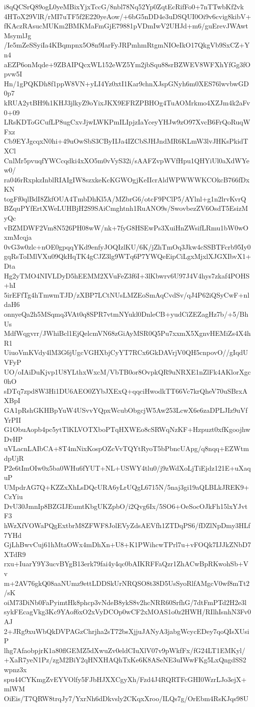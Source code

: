 i8qQCSrQ89ogL0yeMBixYjxTccG/8nbl78Nq52Yp0ZqtEcRifFo0+7nTTwbKf2vk
4HToX29VlR/rMI7uTF5f2E220yeAow/+6bG5nDD4e3uDSQUI0Oi9v6cvig8kibV+
fKAczRAsucMUKm2BMKMaFmGjE79881pVDmIwV2UHJd+m6/guErevJWAwtMsymlJg
/Ie5mZeSSyiIa4KBqmpnx5O8n9IarFyJRPmhmRtgmNIOeIkO17QkgVb9SxCZ+Yn4
aEZP6onMqde+9ZBAIPQcxWL152eWZ5Ym2jbSqu88srBZWEV8WFXhYfGg3fOpvw5I
Hn/1gPQKDh8f1ppW8VN+yLI4Yz0xtI1Kar9chnXJspGNyh6m0XES76lwvbwGD0p7
kRUA2ytBH9h1KHJ3jlkyZ9oYixJKX9EFRZPBHOg4TuAOMrkmo4XZJm4k2aFv0+09
LRsKDToGCufLP8ugCxvJjwLWKPmILIpjzIaYceyYHJw9zO97XvcB6FrQoRuqWFxz
Cb9EYJgcqxN0hi+49uOwSbS3CByIIJa4IZCbSJHJndMR6KLmW3lvJHKsPkidTXCl
CnlMr5pvuqfYWCcqdki4xXO5m0vVyS32i/sAAFZvpWVfHpu1QHYiUl0aXdWYew0/
ra046rRxpkzInblRIAIgIW8szxkeKcKGWOgjKeIIcrAldWPWWWKCOkcB766fDxKN
togFf0qlBdI8ZkfOUA4TmbDhKl5A/MZbrG6/otcF9PClP5/AYlnl+g1n2lrvKvrQ
BZquPYfErtXWeLUHBjH2S9SAiCmghtnh1RuANO9s/SwovbezZV6OsdT5EsizMyQc
vBZMDWF2Vm8N526PH08wW/nk+7fyG8HSEwPs3XuiHnZWsifLRmu1bW0wOxmMcqja
0vG3w0zlc+nOE0gpqqYKd9enfyJOQIzlKU/6K/jZhTmOq3Jkw4cSSBTFcrb95Iy0
gqRsToIMlVXu09QkHqTK4gCJZ3lg9WTq6P7YWQeEipCiLgxMjxlXJGXIbvX1+Dta
Hg2yTMO4NIVLDyD5hEEMM2XVuFeZ3f6I+3lKbwrv6U97J4V4hys7zkaf4POHS+hI
5irEFfTg4hTmwmTJD/zXBP7LCtNUsLMZEoSmAqCvdSv/qJ4P62iQSyCwF+nldaH6
onnyeQa2h5MSqmq3VAt0q8SPR7vtmNYukl0DnleCB+yudCiZEZagHz7b/+5/BhUs
MdfWqgvrr/JWhiBcl1EjQelcmVN68zGiAyMSR0Q5Pu7xxmX5XgnvHEMiZs4X4hR1
UiuoVmKVdy4lM3G6jUgcVGHXbjCyYT7RCx6GkDAVrjV0QH5cnpovO//gIqdUVFyP
UO/oIAiDuKjvp1U8YLthxWxcM/VbTB0or8OvpkQR9uNRXE1nZlFk4AKlorXgc0hO
sDTq7zpd8W3Hi1DU6AEO0ZYbJXExQ+qqciHwodkTT66Vc7krQheV70uSBrxAXBpI
GA1pRshGKHBpYuW4USvvYQpxWcubObgcjW5Aw253LcwX6e6zaDPLJIz9uVfYrPII
G1ObuAopb4pc5ytTlKLVOTXboPTqHXWEo8cSRWqNzKF+Hzpuzt0xfKgoojhwDvHP
uVLacnLAIbCA+8T4mNixKospOZcVvTQYtRyoT5bPbncUApg/q8nqq+EZWtmdpUjR
P2e6tImOIw0x5ba0WHu6fYUT+NL+USWY4tlu0/j9zWdXoLjTiEjdz121E+uXaquP
UMpdrAG7Q+KZZxXhLsDQcURA6yLrUQgL6715N/5naj3gi19aQLBLkJREK9+CzYiu
DvU30JmnIp8BZGIJEumtKbgUKZpbO/i2Qvg6Ix/5SO6+OeSocOJkFh15lxYJvtF3
hWzXfVOWaPQgExtbrM8ZFWF8JolEVyZdsAEVfh1ZTDqPS6/fDZlNpDmy3HLf7YHd
GjLhBwvCuj61hMtaOWx4mDhXn+U8+K1PWihcwTPrl7u+vFOQk7IJJkZNbD7XTdR9
rxu+IuarY9Y3ucvBYgB13erk79fai4y4qc0bAIKRFFaQzr1ZhACwBpRKwohSb+Vv
m+2AV76gkQ08aaNUmz9ettLDDSkUrNRQSO8t38D5UsSyoRlfAMgcV0wf8mTt2/sK
oiM73DiNb0FaPyimtHk8phcp3vNdeB8ykS8v2hcNRR60SrfhG/7dtFmPTd2H2e3l
sykFEcagVkg3Kc9YAof6xO2xVyDCOp0wCF2xMOAS1o0z2HWH/RIlhIsnhN3Fv0AJ
2+JRg9xuWbQkDVPAGzChrjha2sT72bsXjjuJANyA3jabgWcycEDey7qoQIsXUsiP
lhg7AfaobpjrK1a80flGEMZ5dXwuZv0eldCIuXlV07v9pWkfFx/fG24LT1EMKyl/
+XaR7yeN1Pz/zgM2BiY2qHNXHAQhTxKe6K8ASeNE3uIWwFKg5LxQngdSS2wpnz3x
spu44CYKmgZvEYVOlfy5FJbHJXXCgyXh/Fzd4J4RQRTFcGHI0WzrLJo3ejX+mlWM
OiEis/T7QRW8trqJy7/YxrNh6dDkvsly2CKqxXroo/ILQs7g/OrEbm4RsKJqs98U
